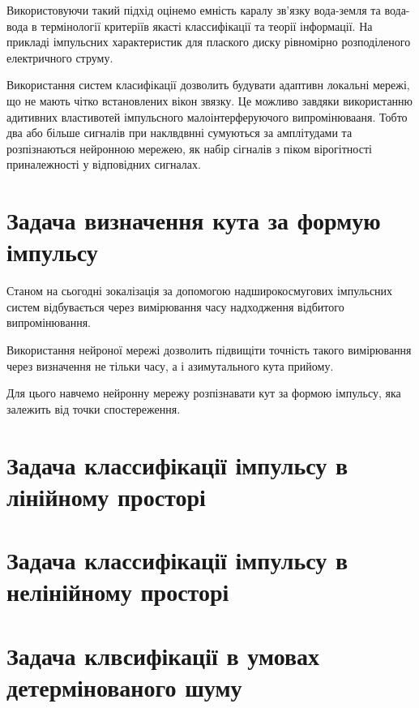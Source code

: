 Використовуючи такий підхід оцінемо емність каралу зв'язку вода-земля та 
вода-вода в термінології критеріїв якасті классифікації та теорії інформації. 
На прикладі імпульсних характеристик для плаского диску рівномірно розподіленого 
електричного струму.

Використання систем класифікації дозволить будувати адаптивн локальні мережі, що 
не мають чітко встановлених вікон звязку. Це можливо завдяки використанню адитивних 
властивотей імпульсного малоінтерферуючого випромінювааня. Тобто два або більше 
сигналів при наклвдвнні сумуються за амплітудами та розпізнаються нейронною мережею,
як набір сігналів з піком вірогітності приналежності у відповідних сигналах.

\section{Задача визначення кута за формую імпульсу}

Станом на сьогодні зокалізація за допомогою надширокосмугових імпульсних систем
відбувається через вимірювання часу надходження відбитого випромінювання.

Використання нейроної мережі дозволить підвищіти точність такого вимірювання
через визначення не тільки часу, а і азимутального кута прийому.

Для цього навчемо нейронну мережу розпізнавати кут за формою імпульсу, яка залежить 
від точки спостереження.

\section{Задача классифікації імпульсу в лінійному просторі}

\section{Задача классифікації імпульсу в нелінійному просторі}

\section{Задача клвсифікації в умовах детермінованого шуму}

